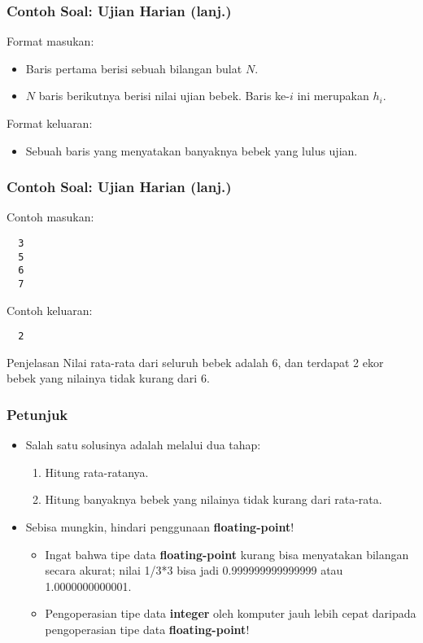 \begin{frame}
\frametitle{Contoh Soal: Ujian Harian (lanj.)}
Format masukan:
\begin{itemize}
  \item Baris pertama berisi sebuah bilangan bulat $N$.
  \item $N$ baris berikutnya berisi nilai ujian bebek. Baris ke-$i$ ini merupakan $h_i$.
\end{itemize}
Format keluaran:
\begin{itemize}
  \item Sebuah baris yang menyatakan banyaknya bebek yang lulus ujian.
\end{itemize}
\end{frame}

\begin{frame}[fragile]
\frametitle{Contoh Soal: Ujian Harian (lanj.)}
Contoh masukan:
\begin{lstlisting}
  3
  5
  6
  7
\end{lstlisting}
Contoh keluaran:
\begin{lstlisting}
  2
\end{lstlisting}
\begin{block}{Penjelasan}
Nilai rata-rata dari seluruh bebek adalah 6, dan terdapat 2 ekor bebek yang nilainya tidak kurang dari 6.
\end{block}
\end{frame}

\begin{frame}
\frametitle{Petunjuk}
\begin{itemize}
  \item Salah satu solusinya adalah melalui dua tahap:
  \begin{enumerate}
    \item Hitung rata-ratanya.
    \item Hitung banyaknya bebek yang nilainya tidak kurang dari rata-rata.
  \end{enumerate}
  \item Sebisa mungkin, hindari penggunaan \textbf{\alert{floating-point}}!
  \begin{itemize}
    \item Ingat bahwa tipe data \textbf{floating-point} kurang bisa menyatakan bilangan secara akurat; nilai 1/3*3 bisa jadi 0.999999999999999 atau 1.0000000000001.
    \item Pengoperasian tipe data \textbf{integer} oleh komputer jauh lebih cepat daripada pengoperasian tipe data \textbf{floating-point}!
  \end{itemize}
\end{itemize}
\end{frame}

